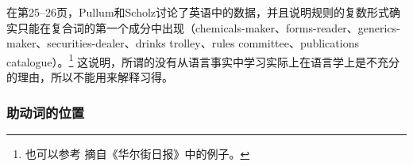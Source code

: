 在第25--26页，Pullum和Scholz讨论了英语中的数据，并且说明规则的复数形式确实只能在复合词的第一个成分中出现（chemicals-maker、forms-reader、generics-maker、securities-dealer、drinks trolley、rules committee、publications
  catalogue）。\footnote{%
也可以参考 摘自《华尔街日报》中的例子。
}
这说明，所谓的没有从语言事实中学习实际上在语言学上是不充分的理由，所以不能用来解释习得。

\subsubsection{助动词的位置}

